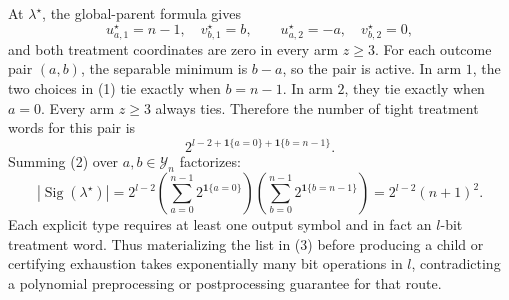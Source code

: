 At \(\lambda^\star\), the global-parent formula gives
\[u^\star_{a,1}=n-1,\quad v^\star_{b,1}=b,\qquad u^\star_{a,2}=-a,\quad v^\star_{b,2}=0,\tag{1}\]
and both treatment coordinates are zero in every arm \(z\ge3\). For each outcome pair \((a,b)\), the separable minimum is \(b-a\), so the pair is active. In arm \(1\), the two choices in (1) tie exactly when \(b=n-1\). In arm \(2\), they tie exactly when \(a=0\). Every arm \(z\ge3\) always ties. Therefore the number of tight treatment words for this pair is
\[2^{l-2+\mathbf1\{a=0\}+\mathbf1\{b=n-1\}}.\tag{2}\]
Summing (2) over \(a,b\in\mathcal Y_n\) factorizes:
\[|\operatorname{Sig}(\lambda^\star)|=2^{l-2}\left(\sum_{a=0}^{n-1}2^{\mathbf1\{a=0\}}\right)\left(\sum_{b=0}^{n-1}2^{\mathbf1\{b=n-1\}}\right)=2^{l-2}(n+1)^2.\tag{3}\]
Each explicit type requires at least one output symbol and in fact an \(l\)-bit treatment word. Thus materializing the list in (3) before producing a child or certifying exhaustion takes exponentially many bit operations in \(l\), contradicting a polynomial preprocessing or postprocessing guarantee for that route.